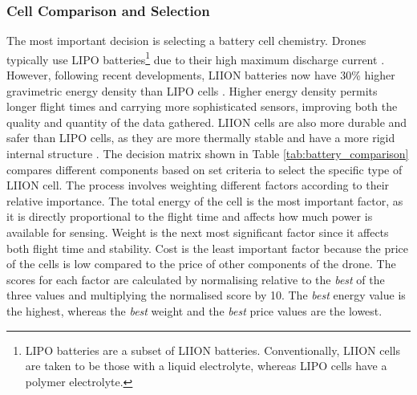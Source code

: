 \subsubsection{Cell Comparison and Selection}

The most important decision is selecting a battery cell chemistry. Drones typically use \gls{LIPO} batteries\footnote{\acrshort{LIPO} batteries are a subset of \acrshort{LIION} batteries. Conventionally, \acrshort{LIION} cells are taken to be those with a liquid electrolyte, whereas \acrshort{LIPO} cells have a polymer electrolyte.} due to their high maximum discharge current \cite{10808488}. However, following recent developments, \gls{LIION} batteries now have 30\% higher gravimetric energy density than \acrshort{LIPO} cells  \cite{Agrawal_2008}. Higher energy density permits longer flight times and carrying more sophisticated sensors, improving both the quality and quantity of the data gathered. \acrshort{LIION} cells are also more durable and safer than \acrshort{LIPO} cells, as they are more thermally stable and have a more rigid internal structure \cite{bergveld2014battery}. The decision matrix shown in Table \ref{tab:battery_comparison} compares different components based on set criteria to select the specific type of \acrshort{LIION} cell. The process involves weighting different factors according to their relative importance. The total energy of the cell is the most important factor, as it is directly proportional to the flight time and affects how much power is available for sensing. Weight is the next most significant factor since it affects both flight time and stability. Cost is the least important factor because the price of the cells is low compared to the price of other components of the drone. The scores for each factor are calculated by normalising relative to the \textit{best} of the three values and multiplying the normalised score by 10. The \textit{best} energy value is the highest, whereas the \textit{best} weight and the \textit{best} price values are the lowest. 

